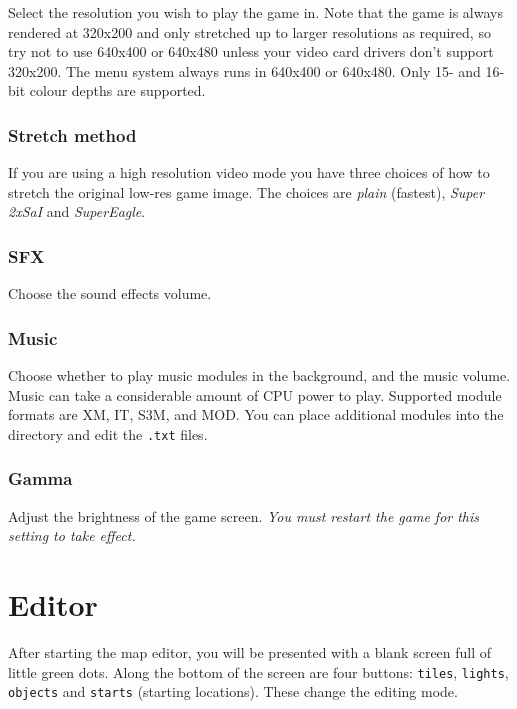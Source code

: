\documentclass[a4paper]{article}
\begin{document}
Select the resolution you wish to play the game in.  Note that the
game is always rendered at 320x200 and only stretched up to larger
resolutions as required, so try not to use 640x400 or 640x480 unless
your video card drivers don't support 320x200.  The menu system always
runs in 640x400 or 640x480.  Only 15- and 16-bit colour depths are
supported.

\subsubsection*{Stretch method}

If you are using a high resolution video mode you have three choices
of how to stretch the original low-res game image.  The choices are
\emph{plain} (fastest), \emph{Super 2xSaI} and \emph{SuperEagle}.

\subsubsection*{SFX}

Choose the sound effects volume.

\subsubsection*{Music}

Choose whether to play music modules in the background, and the music
volume.  Music can take a considerable amount of CPU power to play.
Supported module formats are XM, IT, S3M, and MOD.  You can place
additional modules into the  directory and edit the
\texttt{.txt} files.

\subsubsection*{Gamma}

Adjust the brightness of the game screen.  \emph{You must restart the
game for this setting to take effect.}



\section{Editor}

After starting the map editor, you will be presented with a blank
screen full of little green dots.  Along the bottom of the screen are
four buttons: \texttt{tiles}, \texttt{lights}, \texttt{objects} and
\texttt{starts} (starting locations).  These change the editing mode.
\end{document}

